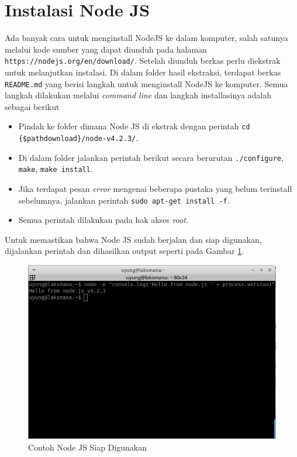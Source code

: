 \documentclass{ta-its}
\begin{document}
		\section{Instalasi Node JS}
			Ada banyak cara untuk menginstall NodeJS ke dalam komputer, salah satunya melalui kode sumber yang dapat diunduh pada halaman \texttt{https://nodejs.org/en/download/}. Setelah diunduh berkas perlu diekstrak untuk melanjutkan instalasi. Di dalam folder hasil ekstraksi, terdapat berkas \texttt{README.md} yang berisi langkah untuk menginstall NodeJS ke komputer. Semua langkah dilakukan melalui \textit{command line} dan langkah installasinya adalah sebagai berikut
			
			\begin{itemize}
				\item Pindah ke folder dimana Node JS di ekstrak dengan perintah \texttt{cd \{\$pathdownload\}/node-v4.2.3/}.
				\item Di dalam folder jalankan perintah berikut secara berurutan \texttt{./configure}, \texttt{make}, \texttt{make install}.
				\item Jika terdapat pesan \textit{error} mengenai beberapa pustaka yang belum terinstall sebelumnya, jalankan perintah \texttt{sudo apt-get install -f}.
				\item Semua perintah dilakukan pada hak akses \textit{root}.
			\end{itemize}
			
			Untuk memastikan bahwa Node JS sudah berjalan dan siap digunakan, dijalankan perintah dan dihasilkan output seperti pada Gambar \ref{gambarCekNodeJS}.
			
			\begin{figure}[h] %
				\centering
				\includegraphics[width=\linewidth]{contoh_img/ceknodejs}
				\caption{Contoh Node JS Siap Digunakan}
				\label{gambarCekNodeJS}
			\end{figure}
		
\end{document}
